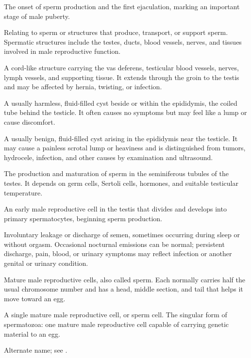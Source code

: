  The onset of sperm production and the first ejaculation, marking an important stage of male puberty.

 Relating to sperm or structures that produce, transport, or support sperm. Spermatic structures include the testes, ducts, blood vessels, nerves, and tissues involved in male reproductive function.

 A cord-like structure carrying the vas deferens, testicular blood vessels, nerves, lymph vessels, and supporting tissue. It extends through the groin to the testis and may be affected by hernia, twisting, or infection.

 A usually harmless, fluid-filled cyst beside or within the epididymis, the coiled tube behind the testicle. It often causes no symptoms but may feel like a lump or cause discomfort.

 A usually benign, fluid-filled cyst arising in the epididymis near the testicle. It may cause a painless scrotal lump or heaviness and is distinguished from tumors, hydrocele, infection, and other causes by examination and ultrasound.

 The production and maturation of sperm in the seminiferous tubules of the testes. It depends on germ cells, Sertoli cells, hormones, and suitable testicular temperature.

 An early male reproductive cell in the testis that divides and develops into primary spermatocytes, beginning sperm production.

 Involuntary leakage or discharge of semen, sometimes occurring during sleep or without orgasm. Occasional nocturnal emissions can be normal; persistent discharge, pain, blood, or urinary symptoms may reflect infection or another genital or urinary condition.

 Mature male reproductive cells, also called sperm. Each normally carries half the usual chromosome number and has a head, middle section, and tail that helps it move toward an egg.

 A single mature male reproductive cell, or sperm cell. The singular form of spermatozoa: one mature male reproductive cell capable of carrying genetic material to an egg.

 Alternate name; see .

